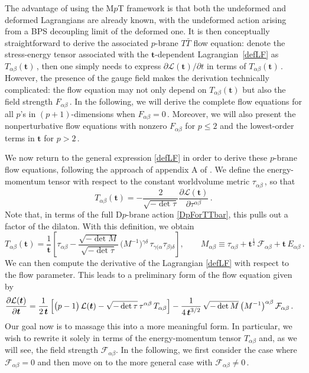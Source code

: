 \documentclass[11pt]{article}
\newcommand{\be}{\begin{equation}}
\newcommand{\ee}{\end{equation}}
\newcommand{\CF}{\mathcal{F}}
\newcommand{\CL}{\mathcal{L}}
\newcommand{\p}{\partial}
\newcommand{\lambdap}{\boldsymbol{t}}
\begin{document}
The advantage of using the M$p$T framework is that both the undeformed and deformed Lagrangians are already known, with the undeformed action arising from a BPS decoupling limit of the deformed one. It is then conceptually straightforward to derive the associated $p$-brane $T\bar{T}$ flow equation: denote the stress-energy tensor associated with the $\lambdap$-dependent Lagrangian~\eqref{defLF} as $T_{\alpha\beta} (\lambdap)$\,, then one simply needs to express $\p \CL(\lambdap) / \p t$ in terms of $T_{\alpha\beta} (\lambdap)$\,. However, the presence of the gauge field makes the derivation technically complicated: the flow equation may not only depend on $T_{\alpha\beta}(\lambdap)$ but also the field strength $F_{\alpha\beta}$\,. In the following, we will derive the complete flow equations for all $p$'s in $(p+1)$-dimensions when $F_{\alpha\beta} = 0$\,. Moreover, we will also present the nonperturbative flow equations with nonzero $F_{\alpha\beta}$ for $p \leq 2$ and the lowest-order terms in $\lambdap$ for $p > 2$\,. 

We now return to the general expression  \eqref{defLF} in order to derive these $p$-brane flow equations, following the approach of appendix A of \cite{Blair:2020ops}.
We define the energy-momentum tensor with respect to the constant worldvolume metric $\tau^{}_{\alpha \beta}$\,, so that
\be
T_{\alpha \beta} (\lambdap) = - \frac{2}{\sqrt{-\det\tau}} \frac{\partial \mathcal{L}(\lambdap)}{\partial \tau^{\alpha \beta}}\,.
\label{defT}
\ee
Note that, in terms of the full D$p$-brane action \eqref{DpForTTbar}, this pulls out a factor of the dilaton. 
With this definition, we obtain
%
\be
    T_{\alpha \beta} (\lambdap) = \frac{1}{\lambdap} \left[ \tau_{\alpha \beta} - \frac{\sqrt{- \det M}}{\sqrt{-\det \tau}} \, \bigl(M^{-1} \bigr){}^{\gamma \delta} \, \tau_{\gamma(\alpha} \tau_{\beta) \delta}    
    \right],
        \qquad%
    M_{\alpha\beta} \equiv \tau_{\alpha\beta} +\lambdap^{\frac{1}{2}} \, \mathcal{F}_{\alpha\beta} + \lambdap \, E_{\alpha\beta}\,.
\label{getT}
\ee
We can then compute the derivative of the Lagrangian \eqref{defLF} with respect to the flow parameter. 
This leads to a preliminary form of the flow equation given by
%
\be
\begin{split} 
    \frac{\partial \mathcal{L} (\lambdap)}{\partial \lambdap}  
        &=
    \frac{1}{2 \, \lambdap} \, \Bigl[ \bigl( p-1 \bigr) \, \mathcal{L} (\lambdap) - 
    \sqrt{-\det \tau} \, \tau^{\alpha \beta} \, T_{\alpha \beta}  \Bigr]
    - \frac{1}{4 \, \lambdap^{3/2}} \, \sqrt{-\det M} \, \bigl( M^{-1} \bigr)^{\alpha \beta} \, \mathcal{F}_{\alpha \beta} \,.
\end{split}
\label{flow_equation_general}
\ee
Our goal now is to massage this into a more meaningful form.
In particular, we wish to rewrite it solely in terms of the energy-momentum tensor $T_{\alpha \beta}$ and, as we will see, the field strength $\mathcal{F}_{\alpha \beta}$. In the following, we first consider the case where $\CF_{\alpha\beta} = 0$ and then move on to the more general case with $\CF_{\alpha\beta} \neq 0$\,. 
\end{document}
